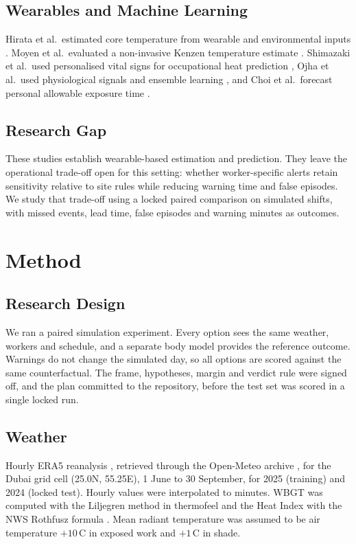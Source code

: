 \documentclass[conference,a4paper]{IEEEtran}
\begin{document}
\subsection{Wearables and Machine Learning}
Hirata et al.\ estimated core temperature from wearable and environmental inputs \cite{hirata}. Moyen et al.\ evaluated a non-invasive Kenzen temperature estimate \cite{moyen}. Shimazaki et al.\ used personalised vital signs for occupational heat prediction \cite{shimazaki}, Ojha et al.\ used physiological signals and ensemble learning \cite{ojha}, and Choi et al.\ forecast personal allowable exposure time \cite{choi}.

\subsection{Research Gap}
These studies establish wearable-based estimation and prediction. They leave the operational trade-off open for this setting: whether worker-specific alerts retain sensitivity relative to site rules while reducing warning time and false episodes. We study that trade-off using a locked paired comparison on simulated shifts, with missed events, lead time, false episodes and warning minutes as outcomes.

\section{Method}

\subsection{Research Design}
We ran a paired simulation experiment. Every option sees the same weather, workers and schedule, and a separate body model provides the reference outcome. Warnings do not change the simulated day, so all options are scored against the same counterfactual. The frame, hypotheses, margin and verdict rule were signed off, and the plan committed to the repository, before the test set was scored in a single locked run.

\subsection{Weather}
Hourly ERA5 reanalysis \cite{era5}, retrieved through the Open-Meteo archive \cite{openmeteo}, for the Dubai grid cell (25.0\textdegree N, 55.25\textdegree E), 1 June to 30 September, for 2025 (training) and 2024 (locked test). Hourly values were interpolated to minutes. WBGT was computed with the Liljegren method \cite{liljegren} in thermofeel \cite{thermofeel} and the Heat Index with the NWS Rothfusz formula \cite{rothfusz}. Mean radiant temperature was assumed to be air temperature $+10$\,\textdegree C in exposed work and $+1$\,\textdegree C in shade.
\end{document}
